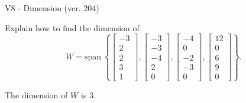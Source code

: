 \begin{exercise}
  \begin{exerciseTitle}V8 - Dimension (ver. 204)\end{exerciseTitle}
  \begin{exerciseStatement}
    Explain how to find the dimension of 
\[W=\mathrm{span}\ \left\{\left[\begin{array}{r}
-3 \\
2 \\
2 \\
3 \\
1
\end{array}\right] , \left[\begin{array}{r}
-3 \\
-3 \\
-4 \\
2 \\
0
\end{array}\right] , \left[\begin{array}{r}
-4 \\
0 \\
-2 \\
-3 \\
0
\end{array}\right] , \left[\begin{array}{r}
12 \\
0 \\
6 \\
9 \\
0
\end{array}\right]\right\}.\]



  \end{exerciseStatement}
  \begin{exerciseAnswer}
   The dimension of \(W\) is  \(3\).
  


  \end{exerciseAnswer}
\end{exercise}